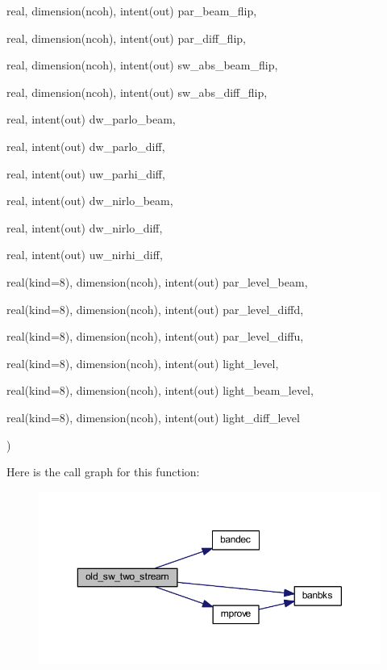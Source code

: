 {\begin{DoxyParamCaption}
\item[{real, dimension(ncoh), intent(out)}]{par\+\_\+beam\+\_\+flip, }
\item[{real, dimension(ncoh), intent(out)}]{par\+\_\+diff\+\_\+flip, }
\item[{real, dimension(ncoh), intent(out)}]{sw\+\_\+abs\+\_\+beam\+\_\+flip, }
\item[{real, dimension(ncoh), intent(out)}]{sw\+\_\+abs\+\_\+diff\+\_\+flip, }
\item[{real, intent(out)}]{dw\+\_\+parlo\+\_\+beam, }
\item[{real, intent(out)}]{dw\+\_\+parlo\+\_\+diff, }
\item[{real, intent(out)}]{uw\+\_\+parhi\+\_\+diff, }
\item[{real, intent(out)}]{dw\+\_\+nirlo\+\_\+beam, }
\item[{real, intent(out)}]{dw\+\_\+nirlo\+\_\+diff, }
\item[{real, intent(out)}]{uw\+\_\+nirhi\+\_\+diff, }
\item[{real(kind=8), dimension(ncoh), intent(out)}]{par\+\_\+level\+\_\+beam, }
\item[{real(kind=8), dimension(ncoh), intent(out)}]{par\+\_\+level\+\_\+diffd, }
\item[{real(kind=8), dimension(ncoh), intent(out)}]{par\+\_\+level\+\_\+diffu, }
\item[{real(kind=8), dimension(ncoh), intent(out)}]{light\+\_\+level, }
\item[{real(kind=8), dimension(ncoh), intent(out)}]{light\+\_\+beam\+\_\+level, }
\item[{real(kind=8), dimension(ncoh), intent(out)}]{light\+\_\+diff\+\_\+level}
\end{DoxyParamCaption}
)}\label{old__twostream__rad_8f90_ac90aec0e7fa711f6b96d200ae35c737a}


Here is the call graph for this function\+:\nopagebreak
\begin{figure}[H]
\begin{center}
\leavevmode
\includegraphics[width=350pt]{old__twostream__rad_8f90_ac90aec0e7fa711f6b96d200ae35c737a_cgraph}
\end{center}
\end{figure}




